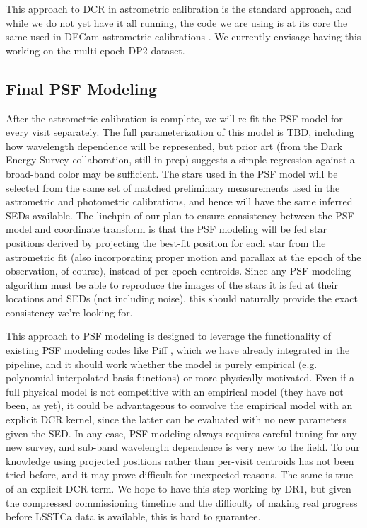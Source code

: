 \documentclass[DM,authoryear,toc]{lsstdoc}
\begin{document}
This approach to DCR in astrometric calibration is the standard approach, and while we do not yet have it all running, the code we are using is at its core the same used in DECam astrometric calibrations \citep{2017PASP..129g4503B}. 
We currently envisage having this working on the multi-epoch DP2 dataset. 

\subsection{Final PSF Modeling}

After the astrometric calibration is complete, we will re-fit the PSF model for every visit separately.
The full parameterization of this model is TBD, including how wavelength dependence will be represented, but prior art (from the Dark Energy Survey collaboration, still in prep) suggests a simple regression against a broad-band color may be sufficient.
The stars used in the PSF model will be selected from the same set of matched preliminary measurements used in the astrometric and photometric calibrations, and hence will have the same inferred SEDs available.
The linchpin of our plan to ensure consistency between the PSF model and coordinate transform is that the PSF modeling will be fed star positions derived by projecting the best-fit position for each star from the astrometric fit (also incorporating proper motion and parallax at the epoch of the observation, of course), instead of per-epoch centroids.
Since any PSF modeling algorithm must be able to reproduce the images of the stars it is fed at their locations and SEDs (not including noise), this should naturally provide the exact consistency we're looking for.

This approach to PSF modeling is designed to leverage the functionality of existing PSF modeling codes like Piff \citep{2021ascl.soft02024J}, which we have already integrated in the pipeline, and it should work whether the model is purely empirical (e.g. polynomial-interpolated basis functions) or more physically motivated.
Even if a full physical model is not competitive with an empirical model (they have not been, as yet), it could be advantageous to convolve the empirical model with an explicit DCR kernel, since the latter can be evaluated with no new parameters given the SED.
In any case, PSF modeling always requires careful tuning for any new survey, and sub-band wavelength dependence is very new to the field.
To our knowledge using projected positions rather than per-visit centroids has not been tried before, and it may prove difficult for unexpected reasons.
The same is true of an explicit DCR term.
We hope to have this step working by DR1, but given the compressed commissioning timeline and the difficulty of making real progress before LSSTCa data is available, this is hard to guarantee.
\end{document}
